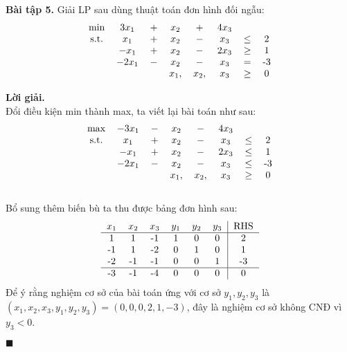 \documentclass[12pt]{article}
\newenvironment{solution}{%
     \setlength\parindent{0pt}\par\medskip\textbf{Lời giải.}\quad}{%
     \hfill\tiny$\blacksquare$\par\medskip}
\begin{document}
    \textbf{Bài tập 5.} Giải LP sau dùng thuật toán đơn hình đối ngẫu:
    \begin{align*}
        \begin{tabular}{cccccccc}
            \text{min} & $3x_1$ & $+$ & $x_2$ & $+$ & $4x_3$\\
            \text{s.t.} & $x_1$ & $+$ & $x_2$ & $-$ & $x_3$ & $\leq$ & 2 \\
            & $-x_1$ & $+$ & $x_2$ & $-$ & $2x_3$ & $\geq$ & 1 \\
            & $-2x_1$ & $-$ & $x_2$ & $-$ & $x_3$ & $=$ & -3 \\
            & & & $x_1,$ & $x_2,$ & $x_3$ & $\geq$ & 0
        \end{tabular}
    \end{align*}
    \begin{solution}
        \\
        Đổi điều kiện min thành max, ta viết lại bài toán như sau:
        \begin{align*}
            \begin{tabular}{cccccccc}
                \text{max} & $-3x_1$ & $-$ & $x_2$ & $-$ & $4x_3$\\
                \text{s.t.} & $x_1$ & $+$ & $x_2$ & $-$ & $x_3$ & $\leq$ & 2 \\
                & $-x_1$ & $+$ & $x_2$ & $-$ & $2x_3$ & $\leq$ & 1 \\
                & $-2x_1$ & $-$ & $x_2$ & $-$ & $x_3$ & $\leq$ & -3 \\
                & & & $x_1,$ & $x_2,$ & $x_3$ & $\geq$ & 0
            \end{tabular}
        \end{align*}
        \\
        Bổ sung thêm biến bù ta thu được bảng đơn hình sau:
        \begin{align*}
            \begin{tabular}{cccccc|c}
                $x_1$ & $x_2$ & $x_3$ & $y_1$ & $y_2$ & $y_3$ & RHS \\ \hline
                1 & 1 & -1 & 1 & 0 & 0 & 2 \\
                -1 & 1 & -2 & 0 & 1 & 0 & 1 \\
                -2 & -1 & -1 & 0 & 0 & 1 & -3 \\ \hline
                -3 & -1 & -4 & 0 & 0 & 0 & 0
            \end{tabular}
        \end{align*}
        Để ý rằng nghiệm cơ sở của bài toán ứng với cơ sở ${y_1, y_2, y_3}$ là $(x_1, x_2, x_3, y_1, y_2, y_3) = (0, 0, 0, 2, 1, -3)$, đây là nghiệm cơ sở không CNĐ vì $y_3 < 0$.

\end{solution}
\end{document}
